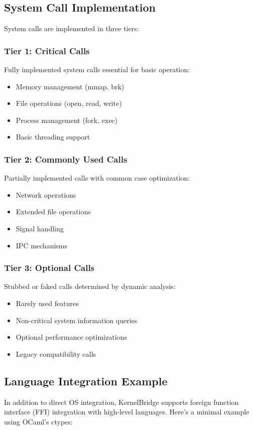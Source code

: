 \documentclass[conference]{IEEEtran}
\begin{document}
\subsection{System Call Implementation}
System calls are implemented in three tiers:

\subsubsection{Tier 1: Critical Calls}
Fully implemented system calls essential for basic operation:
\begin{itemize}
	\item Memory management (mmap, brk)
	\item File operations (open, read, write)
	\item Process management (fork, exec)
	\item Basic threading support
\end{itemize}

\subsubsection{Tier 2: Commonly Used Calls}
Partially implemented calls with common case optimization:
\begin{itemize}
	\item Network operations
	\item Extended file operations
	\item Signal handling
	\item IPC mechanisms
\end{itemize}

\subsubsection{Tier 3: Optional Calls}
Stubbed or faked calls determined by dynamic analysis:
\begin{itemize}
	\item Rarely used features
	\item Non-critical system information queries
	\item Optional performance optimizations
	\item Legacy compatibility calls
\end{itemize}


\subsection{Language Integration Example}
In addition to direct OS integration, KernelBridge
supports foreign function interface (FFI)
integration with high-level languages. Here's a
minimal example using OCaml's ctypes:
\end{document}
